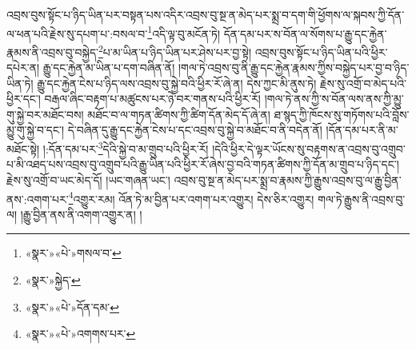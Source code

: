 འབྲས་བུས་སྟོང་པ་ཉིད་ཡིན་པར་བསྟན་པས་འདིར་འབྲས་བུ་སྔ་ན་མེད་པར་སྨྲ་བ་དག་གི་ཕྱོགས་ལ་སྐབས་ཀྱི་དོན་ལ་ཕན་པའི་རྗེས་སུ་དཔག་པ་:བསལ་བ་\footnote{«སྣར་»«པེ་»གསལ་བ་}འདི་ལྟ་བུ་མངོན་ཏེ། དོན་དམ་པར་ས་བོན་ལ་སོགས་པ་རྒྱུ་དང་རྐྱེན་རྣམས་ནི་འབྲས་བུ་བསྐྱེད་\footnote{«སྣར་»སྐྱེད་}པ་མ་ཡིན་པ་ཉིད་ཡིན་པར་ཤེས་པར་བྱ་སྟེ། འབྲས་བུས་སྟོང་པ་ཉིད་ཡིན་པའི་ཕྱིར་དཔེར་ན། རྒྱུ་དང་རྐྱེན་མ་ཡིན་པ་དག་བཞིན་ནོ། །གལ་ཏེ་འབྲས་བུ་ནི་རྒྱུ་དང་རྐྱེན་རྣམས་ཀྱིས་བསྐྱེད་པར་བྱ་བ་ཉིད་ཡིན་ཏེ། རྒྱུ་དང་རྐྱེན་ངེས་པ་ཉིད་ལས་འབྲས་བུ་སྐྱེ་བའི་ཕྱིར་རོ་ཞེ་ན། དེས་ཀྱང་མི་ནུས་ཏེ། རྗེས་སུ་འགྲོ་བ་མེད་པའི་ཕྱིར་དང་། བརྒལ་ཞིང་བརྟག་པ་མཚུངས་པར་ཉེ་བར་གནས་པའི་ཕྱིར་རོ། །གལ་ཏེ་ནས་ཀྱི་ས་བོན་ལས་ནས་ཀྱི་མྱུ་གུ་སྐྱེ་བར་མཐོང་བས། མཐོང་བ་ལ་གཏན་ཚིགས་ཀྱི་ཚིག་དོན་མེད་དོ་ཞེ་ན། ཐ་སྙད་ཀྱི་ཁོངས་སུ་གཏོགས་པའི་བློས་མྱུ་གུ་སྐྱེ་བ་དང་། དེ་བཞིན་དུ་རྒྱུ་དང་རྐྱེན་ངེས་པ་དང་འབྲས་བུ་སྐྱེ་བ་མཐོང་བ་ནི་བདེན་ནོ། །དོན་དམ་པར་ནི་མ་མཐོང་སྟེ། །:དོན་དམ་པར་\footnote{«སྣར་»«པེ་»དོན་དམ་}དེའི་སྐྱེ་བ་མ་གྲུབ་པའི་ཕྱིར་རོ། །དེའི་ཕྱིར་དེ་ལྟར་ཡོངས་སུ་བརྟགས་ན་འབྲས་བུ་འགྲུབ་པ་མི་འཐད་པས་འབྲས་བུ་འགྲུབ་པའི་རྒྱུ་ཡིན་པའི་ཕྱིར་རོ་ཞེས་བྱ་བའི་གཏན་ཚིགས་ཀྱི་དོན་མ་གྲུབ་པ་ཉིད་དང་། རྗེས་སུ་འགྲོ་བ་ཡང་མེད་དོ། །ཡང་གཞན་ཡང་། འབྲས་བུ་སྔ་ན་མེད་པར་སྨྲ་བ་རྣམས་ཀྱི་རྒྱུས་འབྲས་བུ་ལ་རྒྱུ་བྱིན་ནས་:འགག་པར་\footnote{«སྣར་»«པེ་»འགགས་པར་}འགྱུར་རམ། འོན་ཏེ་མ་བྱིན་པར་འགག་པར་འགྱུར། དེས་ཅིར་འགྱུར། གལ་ཏེ་རྒྱུས་ནི་འབྲས་བུ་ལ། །རྒྱུ་བྱིན་ནས་ནི་འགག་འགྱུར་ན། །
